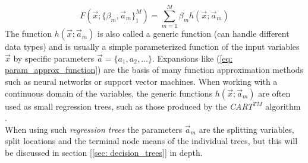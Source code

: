 \documentclass[12pt, a4paper]{article}
\begin{document}
\begin{equation}
    F(\vec{x};\{\beta_m, \vec{a}_m\}_1^M) = \sum_{m=1}^{M} \beta_m h(\vec{x};\vec{a}_m)
    \label{eq: param_approx_function}
\end{equation}
The function $h(\vec{x};\vec{a}_m)$ is also called a generic function (can handle different data types) and is usually a simple parameterized function of the input variables $\vec{x}$ by specific parameters $\vec{a} = \{a_1,a_2,...\}$. Expansions like (\ref{eq: param_approx_function}) are the basis of many function approximation methods such as neural networks or support vector machines. When working with a continuous domain of the variables, the generic functions $h(\vec{x};\vec{a}_m)$ are often used as small regression trees, such as those produced by the \textit{CART}$^{TM}$ algorithm \cite{Breiman1984}. \\
When using such \textit{regression trees} the parameters $\vec{a}_m$ are the splitting variables, split locations and the terminal node means of the individual trees, but this will be discussed in section [\ref{sec: decision_trees}] in depth.
\newpage
\end{document}
